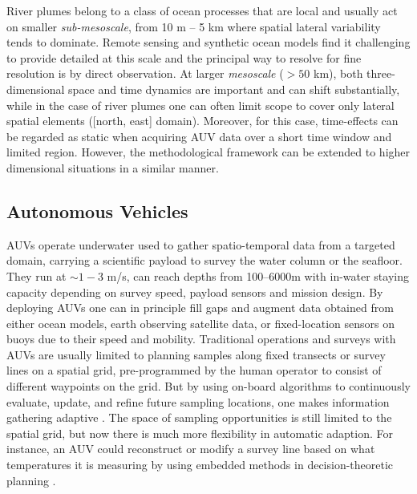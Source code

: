 \documentclass[aoas]{imsart}
\begin{document}


River plumes belong to a class of ocean processes that are local and usually act on smaller \emph{sub-mesoscale}, from 10 m -- 5 km where spatial lateral variability tends to dominate. Remote sensing and synthetic ocean models find it challenging to provide detailed at this scale \citep{Lermusiaux:2006} and the principal way to resolve for fine resolution is by direct observation. At larger \emph{mesoscale} ($>50$ km), both three-dimensional space and time dynamics are important and can shift substantially, while in the case of river plumes one can often limit scope to cover only lateral spatial elements ([north, east] domain). Moreover, for this case, time-effects can be regarded as static when acquiring AUV data over a short time window and limited region. However, the methodological framework can be extended to higher dimensional situations in a similar manner.

\subsection{Autonomous Vehicles}

AUVs operate underwater used to gather spatio-temporal data from a
targeted domain, carrying a scientific payload to survey the water
column or the seafloor. They run at $\sim 1-3$ m/s, can reach depths
from 100--6000m with in-water staying capacity depending on survey
speed, payload sensors and mission design. By deploying AUVs one can in
principle fill gaps and augment data obtained from either ocean models,
earth observing satellite data, or fixed-location sensors on buoys due
to their speed and mobility. Traditional operations and surveys with
AUVs are usually limited to planning samples along fixed transects or survey lines on a spatial grid, pre-programmed by the human operator to 
consist of different waypoints on the grid. But by using on-board
algorithms to continuously evaluate, update, and refine future sampling
locations, one makes information gathering adaptive \citep{das11b}.
The space of sampling opportunities is still limited to the spatial grid, but now there is much more flexibility in automatic adaption.
For instance, an AUV could reconstruct or modify a survey line
based on what temperatures it is measuring by using embedded methods in
decision-theoretic planning \citep{Rajan12b}.
\end{document}
